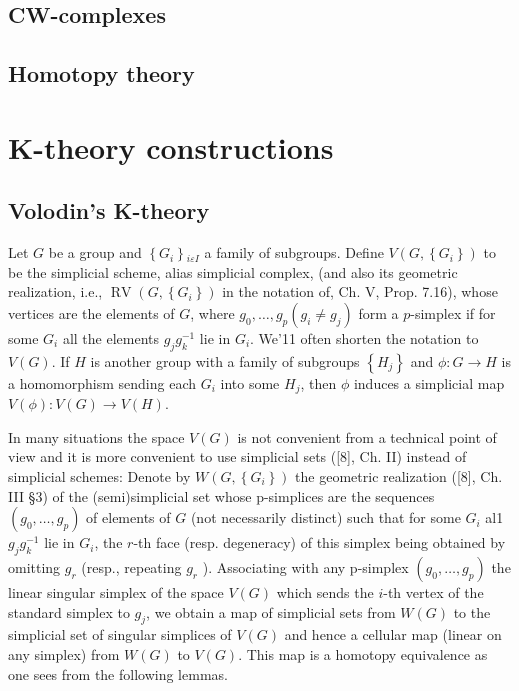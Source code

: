 \documentclass{book}
\begin{document}
\section{CW-complexes}

\section{Homotopy theory}





\chapter{K-theory constructions} 
\section{Volodin's K-theory}

Let $G$ be a group and $\left\{G_i\right\}{ }_{i \varepsilon I}$ a family of subgroups. Define $V\left(G,\left\{G_i\right\}\right)$ to be the simplicial scheme, alias simplicial complex, (and also its geometric realization, i.e., $\operatorname{RV}\left(G,\left\{G_i\right\}\right)$ in the notation of, Ch. V, Prop. 7.16), whose vertices are the elements of $G$, where $g_0, \ldots, g_p\left(g_i \neq g_j\right)$ form a $p$-simplex if for some $G_i$ all the elements $g_j g_k^{-1}$ lie in $G_i$. We'11 often shorten the notation to $V(G)$. If $H$ is another group with a family of subgroups $\left\{H_j\right\}$ and $\phi: G \rightarrow H$ is a homomorphism sending each $G_i$ into some $H_j$, then $\phi$ induces a simplicial map $V(\phi): V(G) \rightarrow V(H)$.

In many situations the space $V(G)$ is not convenient from a technical point of view and it is more convenient to use simplicial sets ([8], Ch. II) instead of simplicial schemes: Denote by $W\left(G,\left\{G_i\right\}\right)$ the geometric realization ([8], Ch. III §3) of the (semi)simplicial set whose p-simplices are the sequences $\left(g_0, \ldots, g_p\right)$ of elements of $G$ (not necessarily distinct) such that for some $G_i$ al1 $g_j g_k^{-1}$ lie in $G_i$, the $r$-th face (resp. degeneracy) of this simplex being obtained by omitting $g_r$ (resp., repeating $g_r$ ). Associating with any p-simplex $\left(g_0, \ldots, g_p\right)$ the linear singular simplex of the space $V(G)$ which sends the $i$-th vertex of the standard simplex to $g_j$, we obtain a map of simplicial sets from $W(G)$ to the simplicial set of singular simplices of $V(G)$ and hence a cellular map (linear on any simplex) from $W(G)$ to $V(G)$. This map is a homotopy equivalence as one sees from the following lemmas.
\end{document}
